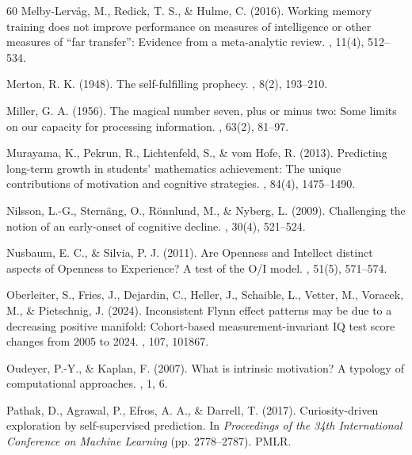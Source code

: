 \documentclass[12pt,a4paper]{article}
\begin{document}
\begin{thebibliography}{60}
Melby-Lerv\aa{}g, M., Redick, T. S., \& Hulme, C. (2016).
\newblock Working memory training does not improve performance on measures of intelligence or other measures of ``far transfer'': Evidence from a meta-analytic review.
, 11(4), 512--534.

Merton, R. K. (1948).
\newblock The self-fulfilling prophecy.
, 8(2), 193--210.

Miller, G. A. (1956).
\newblock The magical number seven, plus or minus two: Some limits on our capacity for processing information.
, 63(2), 81--97.

Murayama, K., Pekrun, R., Lichtenfeld, S., \& vom Hofe, R. (2013).
\newblock Predicting long-term growth in students' mathematics achievement: The unique contributions of motivation and cognitive strategies.
, 84(4), 1475--1490.

Nilsson, L.-G., Stern\"ang, O., R\"onnlund, M., \& Nyberg, L. (2009).
\newblock Challenging the notion of an early-onset of cognitive decline.
, 30(4), 521--524.

Nusbaum, E. C., \& Silvia, P. J. (2011).
\newblock Are Openness and Intellect distinct aspects of Openness to Experience? A test of the O/I model.
, 51(5), 571--574.

Oberleiter, S., Fries, J., Dejardin, C., Heller, J., Schaible, L., Vetter, M., Voracek, M., \& Pietschnig, J. (2024).
\newblock Inconsistent Flynn effect patterns may be due to a decreasing positive manifold: Cohort-based measurement-invariant IQ test score changes from 2005 to 2024.
, 107, 101867.

Oudeyer, P.-Y., \& Kaplan, F. (2007).
\newblock What is intrinsic motivation? A typology of computational approaches.
, 1, 6.

Pathak, D., Agrawal, P., Efros, A. A., \& Darrell, T. (2017).
\newblock Curiosity-driven exploration by self-supervised prediction.
\newblock In {\em Proceedings of the 34th International Conference on Machine Learning} (pp. 2778--2787). PMLR.


\end{thebibliography}
\end{document}
